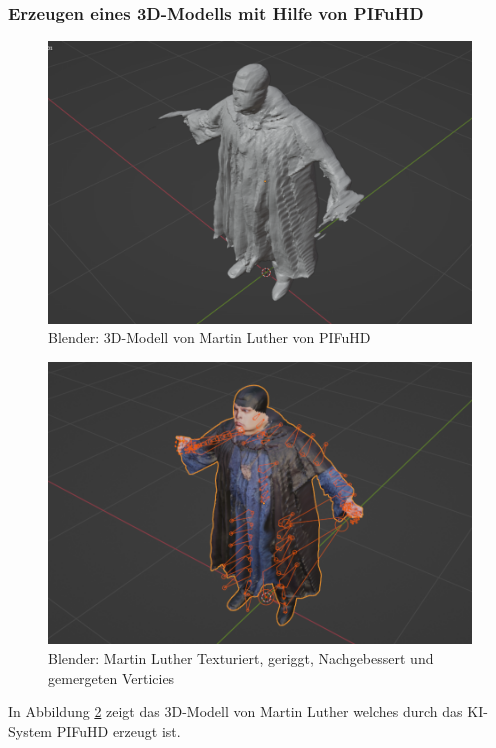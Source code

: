 \documentclass[10pt,a4paper,bibliography=totocnumbered,listof=totocnumbered]{scrartcl}
\begin{document}
\subsubsection{Erzeugen eines 3D-Modells mit Hilfe von PIFuHD}
\begin{figure}
	\centering
	\includegraphics[width=14cm]{BilderFuerBA/Screenshot/BlenderMLVonPIFuHD105k.png}
	\caption{Blender: 3D-Modell von Martin Luther von PIFuHD}
	\label{BlenderMLVonPIFuHD105k}
\end{figure}
\begin{figure}
	\centering
	\includegraphics[width=14cm]{BilderFuerBA/Screenshot/BlenderMLGeriggtUndTexturiert95k.png}
	\caption{Blender: Martin Luther Texturiert, geriggt, Nachgebessert und gemergeten Verticies}
	\label{BlenderMLVonPIFuHD105k}
\end{figure}
In Abbildung \ref{BlenderMLVonPIFuHD105k} zeigt das 3D-Modell von Martin Luther welches durch das KI-System PIFuHD erzeugt ist.
\end{document}
